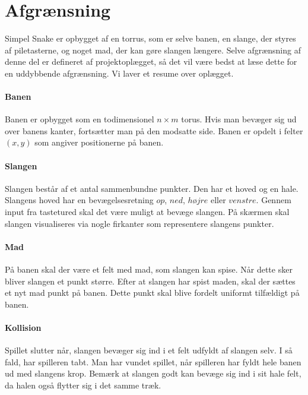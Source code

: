 \section{Afgrænsning}
Simpel Snake er opbygget af en torrus, som er selve banen, en slange, der styres af piletasterne, og noget mad, der kan gøre slangen længere. Selve afgrænsning af denne del er defineret af projektoplægget, så det vil være bedst at læse dette for en uddybbende afgrænsning. Vi laver et resume over oplægget.

\paragraph{Banen}
Banen er opbygget som en todimensionel $n\times m$ torus. Hvis man bevæger sig ud over banens kanter, fortsætter man på den modsatte side. Banen er opdelt i felter $(x,y)$ som angiver positionerne på banen. 

\paragraph{Slangen}
Slangen består af et antal sammenbundne punkter. Den har et hoved og en hale. Slangens hoved har en bevægelsesretning $op$, $ned$, $højre$ eller $venstre$. Gennem input fra tastetured skal det være muligt at bevæge slangen. På skærmen skal slangen visualiseres via nogle firkanter som representere slangens punkter.

\paragraph{Mad}
På banen skal der være et felt med mad, som slangen kan spise. Når dette sker bliver slangen et punkt større. Efter at slangen har spist maden, skal der sættes et nyt mad punkt på banen. Dette punkt skal blive fordelt uniformt tilfældigt på banen.

\paragraph{Kollision}
Spillet slutter når, slangen bevæger sig ind i et felt udfyldt af slangen selv. I så fald, har spilleren tabt. Man har vundet spillet, når spilleren har fyldt hele banen ud med slangens krop. Bemærk at slangen godt kan bevæge sig ind i sit hale felt, da halen også flytter sig i det samme træk.